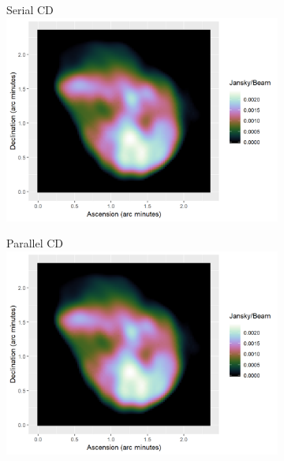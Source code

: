 \begin{figure}[h]
	\centering
	\begin{subfigure}{0.45\linewidth}
		\centering
		Serial CD
		\includegraphics[width=1.0\linewidth]{./chapters/05.pcdm/comparison/SerialCD-N132.png}
	\end{subfigure}
	\begin{subfigure}{0.45\linewidth}
		\centering
		Parallel CD
		\includegraphics[width=1.0\linewidth]{./chapters/05.pcdm/comparison/SerialCD-N132.png}
	\end{subfigure}
	\\
	\begin{subfigure}{0.45\linewidth}
		\centering

\end{subfigure}
\end{figure}
